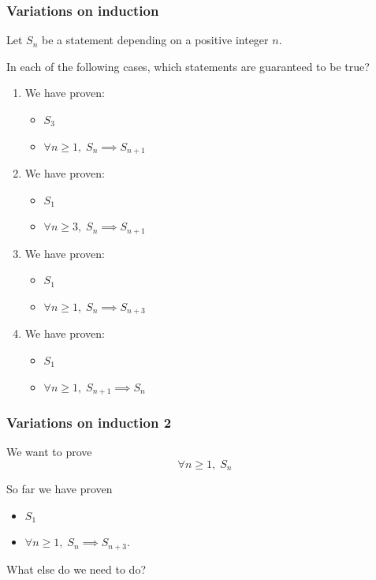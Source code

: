 \begin{frame}
	\frametitle{Variations on induction}

	Let $S_{n}$ be a statement depending on a positive integer $n$.

	\vfill

	In each of the following cases, which statements are guaranteed to be true?

	\vfill

	\begin{multicols}{2}
		\begin{enumerate}
			\item We have proven:
				\begin{itemize}
					\item $S_{3}$

					\item $\displaystyle \forall n \geq 1, \; S_{n}\implies S_{n+1}$
				\end{itemize}

			\item We have proven:
				\begin{itemize}
					\item $S_{1}$

					\item $\displaystyle \forall n \geq 3, \; S_{n}\implies S_{n+1}$
				\end{itemize}

			\item We have proven:
				\begin{itemize}
					\item $S_{1}$

					\item $\displaystyle \forall n \geq 1, \; S_{n}\implies S_{n+3}$
				\end{itemize}

			\item We have proven:
				\begin{itemize}
					\item $S_{1}$

					\item $\displaystyle \forall n \geq 1, \; S_{n+1}\implies S_{n}$
				\end{itemize}
		\end{enumerate}
	\end{multicols}

	\vfill
\end{frame}

\begin{frame}
	\frametitle{Variations on induction 2}

	We want to prove
	\[
		\forall n \geq 1, \; S_{n}
	\]

	\vfill

	So far we have proven
	\begin{itemize}
		\item $S_{1}$

		\item $\displaystyle \forall n \geq 1, \; S_{n}\implies S_{n+3}.$
	\end{itemize}

	\vfill

	What else do we need to do?
\end{frame}

